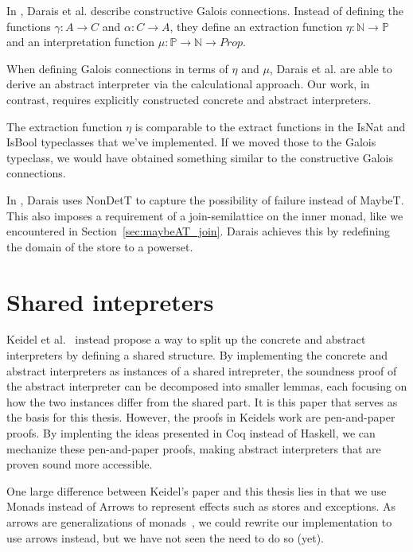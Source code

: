 In \cite{darais2019constructive}, Darais et al. describe constructive Galois
connections. Instead of defining the functions $\gamma : A \rightarrow C$ 
and $\alpha : C \rightarrow A$, they define an extraction function 
$\eta : \mathbb N \rightarrow \mathbb P $ and
an interpretation function $\mu : \mathbb P \rightarrow \mathbb N \rightarrow
Prop$.

When defining Galois connections in terms of $\eta$ and $\mu$, Darais et al.
are able to derive an abstract interpreter via the calculational approach.
Our work, in contrast, requires explicitly constructed concrete and abstract
interpreters.

The extraction function $\eta$ is comparable to the extract functions in the
IsNat and IsBool typeclasses that we've implemented. If we moved those to the
Galois typeclass, we would have obtained something similar to the constructive
Galois connections. 

In \cite{darais2015galois}, Darais uses NonDetT to capture the possibility of
failure instead of MaybeT. This also imposes a requirement of a
join-semilattice on the inner monad, like we encountered in
Section~\ref{sec:maybeAT_join}. Darais achieves this by redefining the domain
of the store to a powerset.

\section{Shared intepreters}
Keidel et al.~\cite{keidel2018compositional} instead propose a way to split up
the concrete and abstract interpreters by defining a shared structure. By
implementing the concrete and abstract interpreters as instances of a shared
intrepreter, the soundness proof of the abstract interpreter can be decomposed
into smaller lemmas, each focusing on how the two instances differ from the
shared part. It is this paper that serves as the basis for this thesis. However,
the proofs in Keidels work are pen-and-paper proofs. By implenting the ideas
presented in Coq instead of Haskell, we can mechanize these pen-and-paper
proofs, making abstract interpreters that are proven sound more accessible.

One large difference between Keidel's paper and this thesis lies in that we use
Monads instead of Arrows to represent effects such as stores and exceptions. As
arrows are generalizations of monads~\cite{hughes2000generalising}, we could
rewrite our implementation to use arrows instead, but we have not seen the need
to do so (yet).
